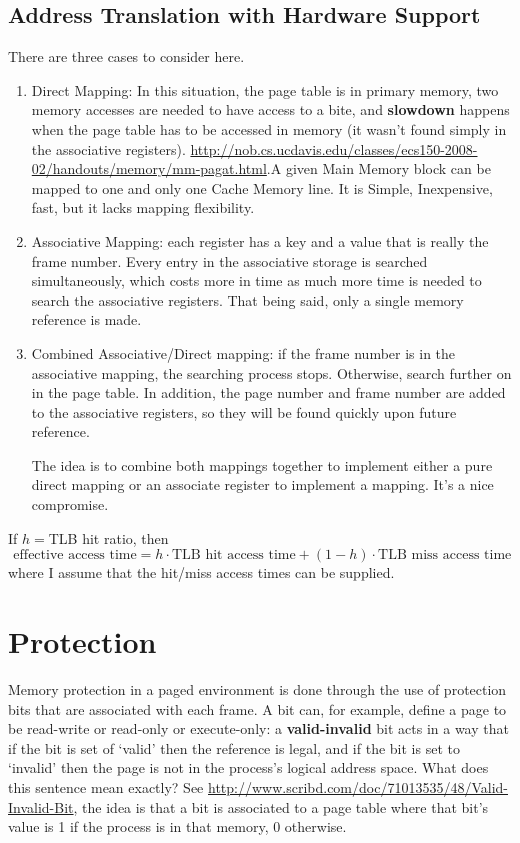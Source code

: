 \documentclass{article}
\begin{document}
\subsection{Address Translation with Hardware Support} 
There are three cases to consider here. 

\begin{enumerate}
\item Direct Mapping: In this situation, the page table is in primary memory, two memory accesses are needed to have access to a bite, and {\bf slowdown} happens when the page table has to be accessed in memory (it wasn't found simply in the associative registers). \url{http://nob.cs.ucdavis.edu/classes/ecs150-2008-02/handouts/memory/mm-pagat.html}.A given Main Memory block can be mapped to one and only one Cache Memory line.
It is Simple, Inexpensive, fast, but it lacks mapping flexibility. 

\item Associative Mapping: each register has a key and a value that is really the frame number. Every entry in the associative storage is searched simultaneously, which costs more in time as much more time is needed to search the associative registers. That being said, only a single memory reference is made. 

\item Combined Associative/Direct mapping: if the frame number is in the associative mapping, the searching process stops. Otherwise, search further on in the page table. In addition, the page number and frame number are added to the associative registers, so they will be found quickly upon future reference. 

The idea is to combine both mappings together to implement either a pure direct mapping or an associate register to implement a mapping. It's a nice compromise. 
\end{enumerate}

If $h=$TLB hit ratio, then
\begin{equation}
\text{ effective access time} = h\cdot \text{TLB hit access time} + (1-h)\cdot \text{TLB miss access time}
\end{equation}
where I assume that the hit/miss access times can be supplied. 

\section{Protection}
Memory protection in a paged environment is done through the use of protection bits that are associated with each frame. A bit can, for example, define a page to be read-write or read-only or execute-only: a {\bf valid-invalid} bit acts in a way that if the bit is set of `valid' then the reference is legal, and if the bit is set to `invalid' then the page is not in the process's logical address space.  What does this sentence mean exactly? See \url{http://www.scribd.com/doc/71013535/48/Valid-Invalid-Bit}, the idea is that a bit is associated to a page table where that bit's value is 1 if the process is in that memory, 0 otherwise. 
\end{document}
